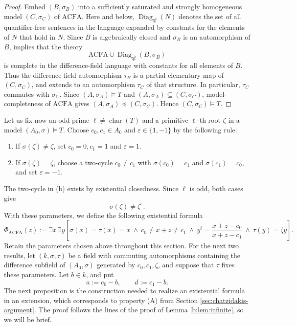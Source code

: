 \documentclass[11pt,a4paper]{amsart}
\theoremstyle{definition}
\DeclareMathOperator{\charac}{char}
\newcommand{\ACFA}{\mathrm{ACFA}}
\begin{document}
\begin{proof}
Embed $(B,\sigma_B)$ into a sufficiently saturated and strongly homogeneous model $(C,\sigma_C)$ of $\ACFA$. Here and below, $\operatorname{Diag}_{\mathrm{qf}}(N)$ denotes
the set of all quantifier-free sentences in the language
expanded by constants for the elements of $N$ that hold in $N$. Since $B$ is algebraically closed and $\sigma_B$ is an
automorphism of $B$, \cite[Theorem~1.3, p.~3008]{CH}
implies that the theory
\[
\ACFA\cup\operatorname{Diag}_{\mathrm{qf}}(B,\sigma_B)
\]
is complete in the difference-field language with constants
for all elements of $B$. Thus the difference-field automorphism $\tau_B$ is a partial elementary map of $(C,\sigma_C)$, and extends to an automorphism $\tau_C$ of that structure. In particular, $\tau_C$ commutes with $\sigma_C$. Since $(A,\sigma_A)\models T$ and
$(A,\sigma_A)\subseteq(C,\sigma_C)$, model-completeness of
$\ACFA$ gives
$(A,\sigma_A)\preccurlyeq(C,\sigma_C)$.
Hence $(C,\sigma_C)\models T$.
 \end{proof}
Let us fix now an odd prime $\ell\neq\charac(T)$ and a primitive $\ell$-th root $\zeta$ in a model $(A_0,\sigma)\models T$. Choose $c_0,c_1\in A_0$ and $\varepsilon\in\{1,-1\}$ by the following rule:
\begin{enumerate}[label=\textup{(\alph*)}]
\item If $\sigma(\zeta)\neq\zeta$, set $c_0=0,c_1=1$ and $\varepsilon=1$.
\item If $\sigma(\zeta)=\zeta$, choose a two-cycle $c_0\neq c_1$ with $\sigma(c_0)=c_1$ and $\sigma(c_1)=c_0$, and set $\varepsilon=-1$.
\end{enumerate}
The two-cycle in (b) exists by existential closedness. Since $\ell$ is odd, both cases give
\begin{equation}\label{a:eq:mismatch}
 \sigma(\zeta)\neq\zeta^\varepsilon.
\end{equation}
With these parameters, we define the following existential formula
\[
\Phi_{\mathrm{ACFA}}(z):=\exists x\,\exists y
 \left[
 \sigma(x)=\tau(x)=x\ \wedge\
 c_0\neq x+z\neq c_1\ \wedge\
 y^\ell=\frac{x+z-c_0}{x+z-c_1}\ \wedge\
 \tau(y)=\zeta y\right].
\]
Retain the parameters chosen above throughout this section.
For the next two results, let $(k,\sigma,\tau)$ be a field with commuting automorphisms
containing the difference subfield of $(A_0,\sigma)$ generated
by $c_0,c_1,\zeta$, and suppose that $\tau$ fixes these parameters.
Let $b\in k$, and put
\[
a:=c_0-b,\qquad d:=c_1-b.
\]
The next proposition is the construction needed to realize an existential formula in an extension, which corresponds to property (A) from Section \ref{sec:chatzidakis-argument}. The proof follows the lines of the proof of Lemma \ref{b:lem:infinite}, so we will be brief.
\end{document}
